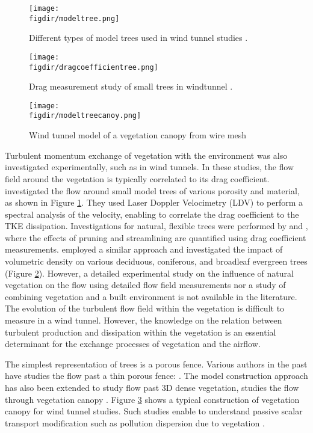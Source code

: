 	\begin{figure}[t]
		\centering
		\texttt{[image: \\figdir/modeltree.png]}
		\caption{Different types of model trees used in wind tunnel studies \citep{Gromke2008a}. }
		\label{fig:modeltree}
	\end{figure}
	
	\begin{figure}[p]
		\centering
		\texttt{[image: \\figdir/dragcoefficientree.png]}
		\caption{Drag measurement study of small trees in windtunnel \citep{Cao2012}.}
		\label{fig:dragcoefficientree}
	\end{figure}
	
	\begin{figure}[p]
		\centering
		\texttt{[image: \\figdir/modeltreecanoy.png]}
		\caption{Wind tunnel model of a vegetation canopy from wire mesh  \citep{Conan2015}}
		\label{fig:modeltreecanoy}
	\end{figure}

Turbulent momentum exchange of vegetation with the environment was also investigated experimentally, such as in wind tunnels. In these studies, the flow field around the vegetation is typically correlated to its drag coefficient. \cite{Gromke2008a} investigated the flow around small model trees of various porosity and material, as shown in Figure \ref{fig:modeltree}. They used Laser Doppler Velocimetry (LDV) to perform a spectral analysis of the velocity, enabling to correlate the drag coefficient to the TKE dissipation. Investigations for natural, flexible trees were performed by \cite{Rudnicki2004} and \cite{Vollsinger2005}, where the effects of pruning and streamlining are quantified using drag coefficient measurements. \cite{Cao2012} employed a similar approach and investigated the impact of volumetric density on various deciduous, coniferous, and broadleaf evergreen trees (Figure \ref{fig:dragcoefficientree}). However, a detailed experimental study on the influence of natural vegetation on the flow using detailed flow field measurements nor a study of combining vegetation and a built environment is not available in the literature. The evolution of the turbulent flow field within the vegetation is difficult to measure in a wind tunnel. However, the knowledge on the relation between turbulent production and dissipation within the vegetation is an essential determinant for the exchange processes of vegetation and the airflow. 

The simplest representation of trees is a porous fence. Various authors in the past have studies the flow past a thin porous fence: \citep{Gandemer1979, Dong2010, Perera1981,Hagen1971,Conan2015}. The model construction approach has also been extended to study flow past 3D dense vegetation, studies the flow through vegetation canopy \citep{Conan2015,Poggi2004}. Figure \ref{fig:modeltreecanoy} shows a typical construction of vegetation canopy for wind tunnel studies. Such studies enable to understand passive scalar transport modification such as pollution dispersion due to vegetation \citep{Gromke2011,Gromke2008}.

